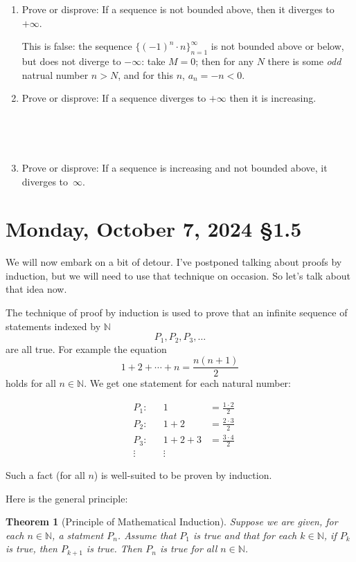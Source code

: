\documentclass[12pt]{amsart}
\def\Mo{Monday}
\newcommand{\N}{\mathbb{N}}
\numberwithin{equation}{section}
\theoremstyle{plain} %
\newtheorem{thm}[equation]{Theorem}
\newcommand{\Oct}[3]{\section{#2, October #1, 2024 \quad \S#3}}
\theoremstyle{definition}
\theoremstyle{remark}
\begin{document}
\begin{enumerate}
\item Prove or disprove: If a sequence is not bounded above, then it diverges to $+\infty$.

\begin{framed}
This is false: the sequence $\{(-1)^n \cdot n\}_{n=1}^\infty$ is not bounded above or below, but does not diverge to $-\infty$: take $M=0$; then for any $N$ there is some \emph{odd} natrual number $n>N$, and for this $n$, $a_n = -n < 0$.
\end{framed}

\item Prove or disprove:  If a sequence diverges to $+\infty$ then it is increasing.

\

\

\item Prove or disprove: If a sequence is increasing and not bounded above, it diverges to~$\infty$.


\end{enumerate}



\newpage


\Oct{7}{\Mo}{1.5}
	
We will now embark on a bit of detour. I've postponed talking about proofs by induction, but we will need to use that technique on occasion. So let's talk
about that idea now. 

The technique of proof by induction is used to prove that an infinite sequence of statements indexed by $\N$
$$
P_1, P_2, P_3, \dots
$$
are all true. For example the equation
$$
1 + 2 + \cdots + n = \frac{n(n+1)}{2}
$$
holds for all $n \in \N$. We get one statement for each natural number:

\[\begin{array}{ccrrl}
	&P_1: &&1 &= \displaystyle\frac{1 \cdot 2}{2}\\[10pt]
		&P_2: &&1 + 2 &=\displaystyle\frac{2 \cdot 3}{2}\\[10pt]
		&P_3: &&1 +2 + 3 &=\displaystyle\frac{3 \cdot 4}{2}\\[10pt]
		&\vdots &&\vdots&
	\end{array}\]

Such a fact (for all $n$) is well-suited to be proven by induction.

Here is the general principle:

\begin{thm}[Principle of Mathematical Induction] Suppose we are given, for each $n \in \N$, a statment $P_n$.  
Assume that $P_1$ is true and that for each $k  \in \N$, if $P_k$ is true, then $P_{k+1}$ is true. Then $P_n$ is true for all $n \in \N$.
\end{thm}
\end{document}

